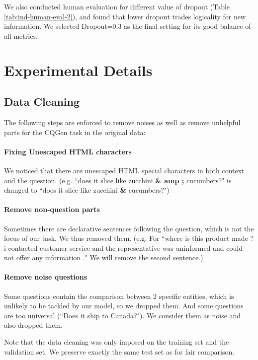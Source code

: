 \documentclass[letterpaper]{article} %
\begin{document}
We also conducted human evaluation for different value of dropout (Table \ref{tab:ind-human-eval-2}), and found that lower dropout trades logicality for new information. We selected Dropout=0.3 as the final setting for its good balance of all metrics.



\section{Experimental Details}
\label{sec:detail}
\subsection{Data Cleaning}
The following steps are enforced to remove noises as well as remove unhelpful parts for the CQGen task in the original data:

\paragraph{Fixing Unescaped HTML characters} We noticed that there are unescaped HTML special characters in both context and the question. (e.g. ``does it slice like zucchini \textbf{\& amp ;} cucumbers?" is changed to ``does it slice like zucchini \textbf{\&} cucumbers?")

\paragraph{Remove non-question parts} Sometimes there are declarative sentences following the question, which is not the focus of our task. We thus removed them. (e.g. For ``where is this product made ? i contacted customer service and the representative was uninformed and could not offer any information ." We will remove the second sentence.)

\paragraph{Remove noise questions} Some questions contain the comparison between 2 specific entities, which is unlikely to be tackled by our model, so we dropped them. And some questions are too universal (``Does it ship to Canada?"). We consider them as noise and also dropped them.

Note that the data cleaning was only imposed on the training set and the validation set. We preserve exactly the same test set as \citet{rao2019answer} for fair comparison.
\end{document}
